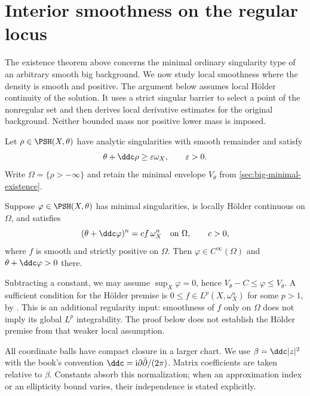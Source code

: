 \section{Interior smoothness on the regular locus}
\label{sec:nonclosed-interior-smoothness}

The existence theorem above concerns the minimal ordinary singularity
type of an arbitrary smooth big background. We now study local
smoothness where the density is smooth and positive. The argument below
assumes local H\"older continuity of the solution. It uses a strict
singular barrier to select a point of the nonregular set and then derives
local derivative estimates for the original background. Neither bounded
mass nor positive lower mass is imposed.

Let $\rho\in\PSH(X,\theta)$ have analytic singularities with smooth
remainder and satisfy
\begin{equation}\label{eq:interior-strict-reference}
 \theta+\ddc\rho\geq\varepsilon\omega_X,
 \qquad \varepsilon>0.
\end{equation}
Write $\Omega=\{\rho>-\infty\}$ and retain the minimal envelope $V_\theta$
from \cref{sec:big-minimal-existence}.

\begin{theorem}\label{thm:nonclosed-interior-smoothness}
Suppose $\varphi\in\PSH(X,\theta)$ has minimal singularities, is locally
H\"older continuous on $\Omega$, and satisfies
\[
 (\theta+\ddc\varphi)^n=cf\,\omega_X^n\quad\text{on }\Omega,
 \qquad c>0,
\]
where $f$ is smooth and strictly positive on $\Omega$. Then
$\varphi\in C^\infty(\Omega)$ and $\theta+\ddc\varphi>0$ there.
\end{theorem}

Subtracting a constant, we may assume $\sup_X\varphi=0$, hence
$V_\theta-C\leq\varphi\leq V_\theta$.
A sufficient condition for the H\"older premise is
$0\leq f\in L^p(X,\omega_X^n)$ for some $p>1$, by
\cite[Theorem~A]{Dang26}. This is an additional regularity input: smoothness
of $f$ only on $\Omega$ does not imply its global $L^p$ integrability.
The proof below does not establish the H\"older premise from that weaker
local assumption.

All coordinate balls have compact closure in a larger chart. We use
$\beta=\ddc|z|^2$ with the book's convention
$\ddc=\mathrm{i}\partial\bar\partial/(2\pi)$. Matrix coefficients are
taken relative to $\beta$. Constants absorb this normalization; when an
approximation index or an ellipticity bound varies, their independence
is stated explicitly.

